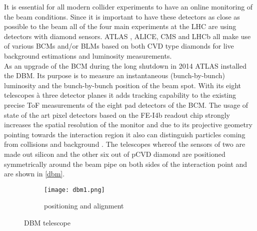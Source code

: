 It is essential for all modern collider experiments to have an online monitoring of the beam conditions. Since it is important to have these detectors as close as possible to the beam all of the four main experiments at the \ac{LHC} are using detectors with diamond sensors. ATLAS \cite{gorisek}, ALICE, CMS \cite{bartz} and LHCb \cite{domke} all make use of various \acp{BCM} and/or \acp{BLM} based on both \ac{CVD} type diamonds for live background estimations and luminosity measurements.\\
As an upgrade of the \ac{BCM} during the long shutdown in 2014 ATLAS installed the \ac{DBM}. Its purpose is to measure an instantaneous (bunch-by-bunch) luminosity and the bunch-by-bunch position of the beam spot. With its eight telescopes à three detector planes it adds tracking capability to the existing precise \ac{ToF} measurements of the eight pad detectors of the \ac{BCM}. The usage of state of the art pixel detectors based on the FE-I4b readout chip strongly increases the spatial resolution of the monitor and due to its projective geometry pointing towards the interaction region it also can distinguish particles coming from collisions and background \cite{dbm}. The telescopes whereof the sensors of two are made out silicon and the other six out of \ac{p}\ac{CVD} diamond are positioned symmetrically around the beam pipe on both sides of the interaction point and are shown in \vref{dbm}.
\begin{figure}
	\centering
	\begin{subfigure}{.66\textwidth}
		\centering
		\vspace*{.05\textheight}
		\texttt{[image: dbm1.png]}
		\vspace*{.02\textheight}
		\caption{positioning and alignment}
	\end{subfigure}
	\caption{\ac{DBM} telescope}
	\label{dbm}
\end{figure}
